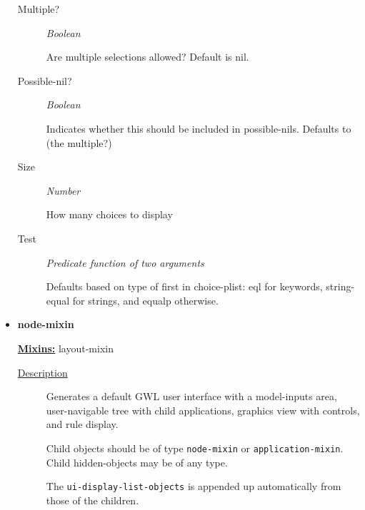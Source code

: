 \documentclass [11pt]{book}
\begin{document}
\begin{itemize}
\begin{description}
\item [Multiple?]
\emph{Boolean}

 Are multiple selections allowed? Default is nil.




\item [Possible-nil?]
\emph{Boolean}

 Indicates whether this should be included in possible-nils. Defaults to (the multiple?)




\item [Size]
\emph{Number}

 How many choices to display




\item [Test]
\emph{Predicate function of two arguments}

 Defaults based on type of first in choice-plist:
eql for keywords, string-equal for strings, and equalp otherwise.




\end{description}







\item {}
\label{prim:node-mixin}
\textbf{node-mixin}


\textbf{
\underline{Mixins:}} layout-mixin





\begin{description}

\item [
\underline{Description}]


Generates a default GWL user interface with a model-inputs area,
user-navigable tree with child applications, graphics view with controls, and rule display. 

Child objects should be of type \texttt{node-mixin} or \texttt{application-mixin}. Child hidden-objects
may be of any type.

The \texttt{ui-display-list-objects} is appended up automatically from those of the children.



\end{description}









\end{itemize}
\end{document}
